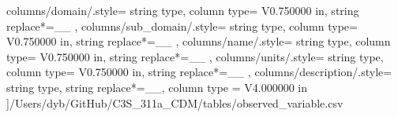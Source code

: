    columns/domain/.style={
            string type, 
            column type= V{0.750000 in}, 
            string replace*={_}{\_}
        },
    columns/sub_domain/.style={
            string type, 
            column type= V{0.750000 in}, 
            string replace*={_}{\_}
        },
    columns/name/.style={
            string type, 
            column type= V{0.750000 in}, 
            string replace*={_}{\_}
        },
    columns/units/.style={
            string type, 
            column type= V{0.750000 in}, 
            string replace*={_}{\_}
        },
    columns/description/.style={
            string type, 
            string replace*={_}{\_},
            column type = V{4.000000 in}
        }
    ]{/Users/dyb/GitHub/C3S_311a_CDM/tables/observed_variable.csv}
